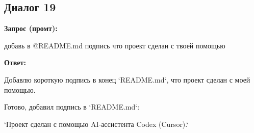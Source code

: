 \documentclass[a4paper, 14pt]{extarticle} %
\begin{document}
\subsection*{Диалог 19}

\textbf{Запрос (промт):}

\begin{PromptBlock}

добавь в @README.md подпись что проект сделан с твоей помощью

\end{PromptBlock}

\textbf{Ответ:}

\begin{AnswerBlock}

Добавлю короткую подпись в конец `README.md`, что проект сделан с моей помощью.

Готово, добавил подпись в `README.md`:

`Проект сделан с помощью AI‑ассистента Codex (Cursor).`

\end{AnswerBlock}
\end{document}

